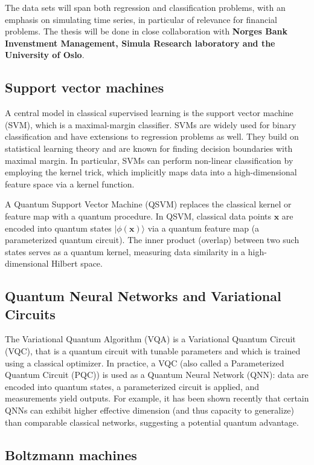 \documentclass[%
oneside,                 %
final,                   %
10pt]{article}
\begin{document}
\noindent
The data sets will span both regression and classification problems,
with an emphasis on simulating time series, in particular  of relevance for financial
problems. The thesis will be done in close collaboration with \textbf{Norges
Bank Invenstment Management, Simula Research laboratory and the
University of Oslo}.

\subsection{Support vector machines}

A central model in classical
supervised learning is the support vector machine (SVM), which is a
maximal-margin classifier.  SVMs are widely used for binary classification
and have extensions to regression problems as well.
They build on statistical learning
theory and are known for finding decision boundaries with maximal
margin.  In particular, SVMs can perform non-linear classification by
employing the kernel trick, which implicitly maps data into a
high-dimensional feature space via a kernel function.

A Quantum Support Vector Machine (QSVM) replaces the classical kernel
or feature map with a quantum procedure.  In QSVM, classical data
points $\bm{x}$ are encoded into quantum states
$|\phi(\bm{x})\rangle$ via a quantum feature map (a parameterized
quantum circuit).  The inner product (overlap) between two such states
serves as a quantum kernel, measuring data similarity in a
high-dimensional Hilbert space.

\subsection{Quantum Neural Networks and Variational Circuits}

The Variational Quantum Algorithm (VQA) is a 
Variational Quantum Circuit (VQC), that is  a quantum circuit with tunable
parameters and which is trained using a classical optimizer.  In practice, a
VQC (also called a Parameterized Quantum Circuit (PQC)) is used as a
Quantum Neural Network (QNN): data are encoded into quantum states, a
parameterized circuit is applied, and measurements yield outputs.
For example, it has been shown recently that certain QNNs can exhibit higher
effective dimension (and thus capacity to generalize) than comparable
classical networks, suggesting a potential quantum advantage.

\subsection{Boltzmann machines}
\end{document}
